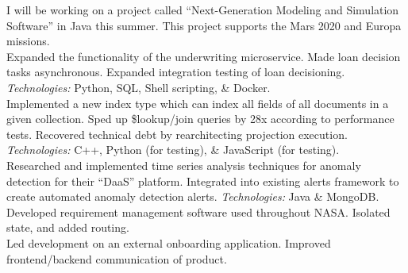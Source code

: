 \documentclass[11pt,letter,sans]{moderncv}
\begin{document}
I will be working on a project called ``Next-Generation Modeling and Simulation Software'' in Java this summer. This project supports the Mars 2020 and Europa missions.
\\
Expanded the functionality of the underwriting microservice.
Made loan decision tasks asynchronous.
Expanded integration testing of loan decisioning.
\textit{Technologies:} Python, SQL, Shell scripting, \& Docker.
\\
Implemented a new index type which can index all fields of all documents in a given collection.
Sped up \$lookup/join queries by 28x according to performance tests.
Recovered technical debt by rearchitecting projection execution.
\textit{Technologies:} C++, Python (for testing), \& JavaScript (for testing).
\\
Researched and implemented time series analysis techniques for anomaly detection for their ``DaaS'' platform. Integrated into existing alerts framework to create automated anomaly detection alerts.
\textit{Technologies:} Java \& MongoDB.
\\
Developed requirement management software used throughout NASA.
Isolated state, and added routing.
\\
Led development on an external onboarding application.
Improved frontend/backend communication of product.
\end{document}
